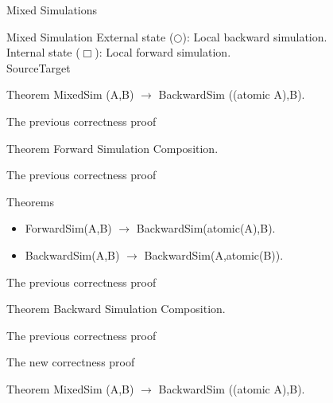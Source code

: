 \begin{frame}{Mixed Simulations}
  \begin{block}{Mixed Simulation}
    External state ($\bigcirc$): Local backward simulation.\\
    Internal state ($\Box$): Local forward simulation.\\
    {\color{blue}Source\hfill\color{red}Target}
    \vspace{-0.8cm}
    \mixed
  \end{block}
  \vfill
  \begin{block}{Theorem}
    MixedSim (A,B) $\rightarrow$ BackwardSim ((atomic A),B).
  \end{block}
\end{frame}

\begin{frame}{The previous correctness proof}
  \oldprooffwds
  \vfill
  \begin{block}{Theorem}
    Forward Simulation Composition.
  \end{block}
\end{frame}

\begin{frame}{The previous correctness proof}
  \oldprooffwd
  \vfill
  \begin{block}{Theorems}
  \begin{itemize}
    \item ForwardSim(A,B) $\rightarrow$ BackwardSim(atomic(A),B).
    \item BackwardSim(A,B) $\rightarrow$ BackwardSim(A,atomic(B)).
  \end{itemize}
  \end{block}
\end{frame}

\begin{frame}{The previous correctness proof}
  \oldprooffactorbwd
  \vfill
  \begin{block}{Theorem}
    Backward Simulation Composition.
  \end{block}
\end{frame}

\begin{frame}{The previous correctness proof}
  \oldprooffinal
\end{frame}

\begin{frame}{The new correctness proof}
  \proofmixed
  \vfill
  \begin{block}{Theorem}
    MixedSim (A,B) $\rightarrow$ BackwardSim ((atomic A),B).
  \end{block}
\end{frame}


